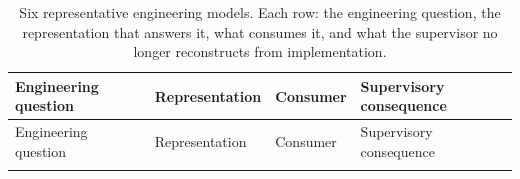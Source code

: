 {\footnotesize
\begin{longtable}[]{@{}
  >{\raggedright\arraybackslash}p{}
  >{\raggedright\arraybackslash}p{}
  >{\raggedright\arraybackslash}p{}
  >{\raggedright\arraybackslash}p{}@{}}
\caption[Census specimens and their supervisory consequences]{Six representative engineering models. Each row: the engineering question, the representation that answers it, what consumes it, and what the supervisor no longer reconstructs from implementation.}\label{factory-census-specimens}\tabularnewline
\toprule\noalign{}
\begin{minipage}[b]{\linewidth}\raggedright
Engineering question
\end{minipage} & \begin{minipage}[b]{\linewidth}\raggedright
Representation
\end{minipage} & \begin{minipage}[b]{\linewidth}\raggedright
Consumer
\end{minipage} & \begin{minipage}[b]{\linewidth}\raggedright
Supervisory consequence
\end{minipage} \\
\midrule\noalign{}
\endfirsthead
\toprule\noalign{}
\begin{minipage}[b]{\linewidth}\raggedright
Engineering question
\end{minipage} & \begin{minipage}[b]{\linewidth}\raggedright
Representation
\end{minipage} & \begin{minipage}[b]{\linewidth}\raggedright
Consumer
\end{minipage} & \begin{minipage}[b]{\linewidth}\raggedright
Supervisory consequence
\end{minipage} \\
\midrule\noalign{}
\endhead
\bottomrule\noalign{}
\endlastfoot


\end{longtable}}
